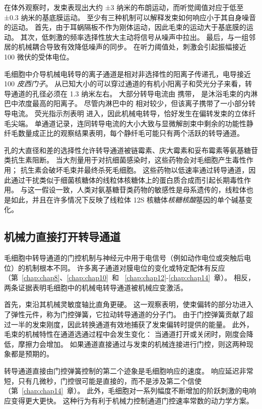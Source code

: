 在体外观察时，发束表现出大约 ±3 纳米的布朗运动，而听觉阈值对应于低至 ±0.3 纳米的基底膜运动。
至少有三种机制可以解释发束如何响应小于其自身噪音的运动。
首先，由于耳蜗隔板不作为刚体运动，因此毛束的运动大于基底膜的运动。
其次，低刺激的频率选择性放大主动将信号从噪声中拉出。
最后，与一组邻居的机械耦合导致有效降低噪声的同步。 
在听力阈值处，刺激会引起振幅接近 100 微伏的受体电位。


毛细胞中介导机械电转导的离子通道是相对非选择性的阳离子传递孔，电导接近 100 \textit{皮西门子}。
从已知大小的可以穿过通道的有机小阳离子和荧光分子来看，转导通道的孔径必须在 1.3 纳米左右。
大部分转导电流由  携带， 是沐浴毛束的内淋巴中浓度最高的阳离子。
尽管内淋巴中的  相对较少，但该离子携带了一小部分转导电流。
荧光指示剂表明  进入，因此机械电转导，恰好发生在偏转发束的立体纤毛尖端。
单通道记录，连同转导电流的大小大致与显微解剖束中剩余的功能性静纤毛数量成正比的观察结果表明，每个静纤毛可能只有两个活跃的转导通道。


孔的大直径和差的选择性允许转导通道被链霉素、庆大霉素和妥布霉素等氨基糖苷类抗生素阻断。
当大剂量用于对抗细菌感染时，这些药物会对毛细胞产生毒性作用；
抗生素会破坏毛束并最终杀死毛细胞。
这些药物以低速率通过转导通道，因此通过干扰类似于细菌核糖体的线粒体核糖体上的蛋白质合成而引起长期毒性作用。
与这一假设一致，人类对氨基糖苷类药物的敏感性是母系遗传的，线粒体也是如此，并且在许多情况下反映了线粒体 12S 核糖体\textit{核糖核酸}基因的单个碱基变化。



\subsection{机械力直接打开转导通道}

毛细胞中转导通道的门控机制与神经元中用于电信号（例如动作电位或突触后电位）的机制根本不同。
许多离子通道对膜电位的变化或特定配体有反应（第~\ref{chap:chap8}、\ref{chap:chap10}~和 ~\ref{chap:chap12}-\ref{chap:chap14}~章）。
相反，两条证据表明毛细胞中的机械电转导通道被机械应变激活。


首先，束沿其机械灵敏度轴比直角更硬。
这一观察表明，使束偏转的部分功进入了弹性元件，称为门控弹簧，它拉动转导通道的分子门。
由于门控弹簧贡献了超过一半的发束刚度，因此转换通道有效地捕获了发束偏转时提供的能量。
此外，毛束的机械特性在通道选通过程中会发生变化：
当通道打开或关闭时，刚度会降低，摩擦力会增加。
如果通道直接通过与发束的机械连接进行门控，则这两种现象都是预期的。


转导通道直接由门控弹簧控制的第二个迹象是毛细胞响应的速度。
响应延迟非常短，只有几微秒，门控很可能是直接的，而不是涉及第二个信使（第~\ref{chap:chap14}~章）。
此外，毛细胞对一系列幅度不断增加的阶跃刺激的电响应变得更大更快。
这种行为有利于机械力控制通道门控速率常数的动力学方案。


